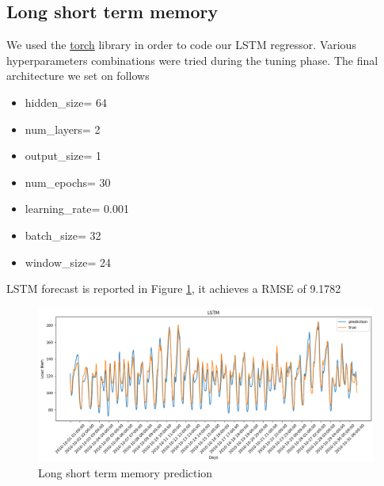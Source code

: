 \subsection{Long short term memory}
We used the \href{https://pytorch.org}{torch} library in order to code our LSTM regressor.
Various hyperparameters combinations were tried during the tuning phase. The final architecture we set on follows
\begin{itemize}
    \item hidden\_size= 64
    \item num\_layers= 2
    \item output\_size= 1
    \item num\_epochs= 30
    \item learning\_rate= 0.001
    \item batch\_size= 32
    \item window\_size= 24
\end{itemize}
LSTM forecast is reported in Figure \ref{fig:lstm_price}, it achieves a RMSE of 9.1782
\begin{figure}[!h]
    \includegraphics[width=\textwidth]{images/lstm_price.png}
    \caption{Long short term memory prediction}
    \label{fig:lstm_price}
\end{figure}

